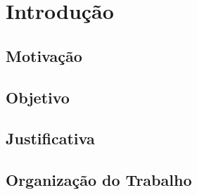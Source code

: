 \chapter{Introdução}
\section{Motivação}
\section{Objetivo}
\section{Justificativa}
\section{Organização do Trabalho}